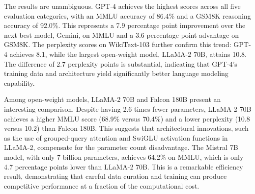 \documentclass[journal]{IEEEtran}
\begin{document}
\begin{table}[h]\centering
\caption{Aggregated Benchmark Performance of Major LLM Families Across Standard Evaluation Tasks}\label{tab:benchmark}
\end{table}

The results are unambiguous. GPT-4 achieves the highest scores across all five evaluation categories, with an MMLU accuracy of 86.4\% and a GSM8K reasoning accuracy of 92.0\%. This represents a 7.9 percentage point improvement over the next best model, Gemini, on MMLU and a 3.6 percentage point advantage on GSM8K. The perplexity scores on WikiText-103 further confirm this trend: GPT-4 achieves 8.1, while the largest open-weight model, LLaMA-2 70B, attains 10.8. The difference of 2.7 perplexity points is substantial, indicating that GPT-4's training data and architecture yield significantly better language modeling capability.

Among open-weight models, LLaMA-2 70B and Falcon 180B present an interesting comparison. Despite having 2.6 times fewer parameters, LLaMA-2 70B achieves a higher MMLU score (68.9\% versus 70.4\%) and a lower perplexity (10.8 versus 10.2) than Falcon 180B. This suggests that architectural innovations, such as the use of grouped-query attention and SwiGLU activation functions in LLaMA-2, compensate for the parameter count disadvantage. The Mistral 7B model, with only 7 billion parameters, achieves 64.2\% on MMLU, which is only 4.7 percentage points lower than LLaMA-2 70B. This is a remarkable efficiency result, demonstrating that careful data curation and training can produce competitive performance at a fraction of the computational cost.
\end{document}
